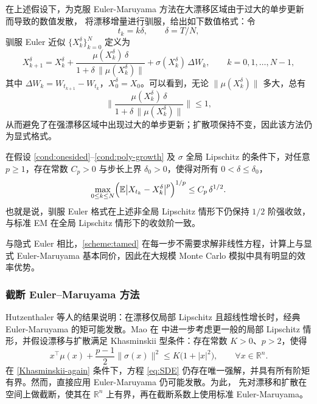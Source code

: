 	在上述假设下，为克服 Euler-Maruyama 方法在大漂移区域由于过大的单步更新而导致的数值发散，\cite{hutzenthaler2012strong} 将漂移增量进行驯服，给出如下数值格式：令
	\[
	t_k = k\delta,\qquad \delta = T/N,
	\]
	驯服 Euler 近似 $\{X_k^{\delta}\}_{k=0}^N$ 定义为
	\begin{equation}\label{scheme:tamed}
		X_{k+1}^{\delta}
		= X_k^{\delta}
		+ \frac{\mu(X_k^{\delta})\,\delta}{1+\delta\,\|\mu(X_k^{\delta})\|}
		+ \sigma(X_k^{\delta})\,\Delta W_k,\qquad k=0,1,\dots,N-1,
	\end{equation}
	其中 $\Delta W_k = W_{t_{k+1}}-W_{t_k}$，$X_0^{\delta}=X_0$。可以看到，无论 $\|\mu(X_k^{\delta})\|$ 多大，总有
	\[
	\biggl\|
	\frac{\mu(X_k^{\delta})\,\delta}{1+\delta\,\|\mu(X_k^{\delta})\|}
	\biggr\|
	\le 1,
	\]
	从而避免了在强漂移区域中出现过大的单步更新；扩散项保持不变，因此该方法仍为显式格式。
	
	\begin{theorem}
		在假设 \eqref{cond:onesided}--\eqref{cond:poly-growth} 及 $\sigma$ 全局 Lipschitz 的条件下，对任意 $p\ge1$，存在常数 $C_p>0$ 与步长上界 $\delta_0>0$，使得对所有 $0<\delta\le\delta_0$，
		\begin{equation}\label{eq:tamed-strong}
			\max_{0\le k\le N}
			\Bigl(\mathbb{E}\bigl|X_{t_k}-X_k^{\delta}\bigr|^p\Bigr)^{1/p}
			\le C_p\,\delta^{1/2}.
		\end{equation}
		也就是说，驯服 Euler 格式在上述非全局 Lipschitz 情形下仍保持 $1/2$ 阶强收敛，与标准 EM 在全局 Lipschitz 情形下的收敛阶一致。
	\end{theorem}
	
	与隐式 Euler 相比，\eqref{scheme:tamed} 在每一步不需要求解非线性方程，计算上与显式 Euler-Maruyama 基本同价，因此在大规模 Monte Carlo 模拟中具有明显的效率优势。
	
	\subsubsection{截断 Euler--Maruyama 方法}
	
	Hutzenthaler 等人的结果说明：在漂移仅局部 Lipschitz 且超线性增长时，经典 Euler-Maruyama 的矩可能发散。Mao 在 \cite{mao2015truncated} 中进一步考虑更一般的局部 Lipschitz 情形，并假设漂移与扩散满足 Khasminskii 型条件：存在常数 $K>0$、$p>2$，使得
	\begin{equation}\label{Khasminskii-again}
		x^{\top}\mu(x)+\frac{p-1}{2}\|\sigma(x)\|^2
		\le K\bigl(1+|x|^2\bigr),
		\qquad \forall x\in\mathbb{R}^n.
	\end{equation}
	在 \eqref{Khasminskii-again} 条件下，方程 \eqref{eq:SDE} 仍存在唯一强解，并具有所有阶矩有界。然而，直接应用 Euler-Maruyama 仍可能发散。为此，\cite{mao2015truncated} 先对漂移和扩散在空间上做截断，使其在 $\mathbb{R}^n$ 上有界，再在截断系数上使用标准 Euler-Maruyama。
	
